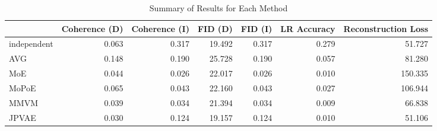 \begin{table}
\caption{Summary of Results for Each Method}
\label{tab:summary_results}
\begin{tabular}{lrrrrrr}
\toprule
 & Coherence (D) & Coherence (I) & FID (D) & FID (I) & LR Accuracy & Reconstruction Loss \\
\midrule
independent & 0.063 & 0.317 & 19.492 & 0.317 & 0.279 & 51.727 \\
AVG & 0.148 & 0.190 & 25.728 & 0.190 & 0.057 & 81.280 \\
MoE & 0.044 & 0.026 & 22.017 & 0.026 & 0.010 & 150.335 \\
MoPoE & 0.065 & 0.043 & 22.160 & 0.043 & 0.027 & 106.944 \\
MMVM & 0.039 & 0.034 & 21.394 & 0.034 & 0.009 & 66.838 \\
JPVAE & 0.030 & 0.124 & 19.157 & 0.124 & 0.010 & 51.106 \\
\bottomrule
\end{tabular}
\end{table}
